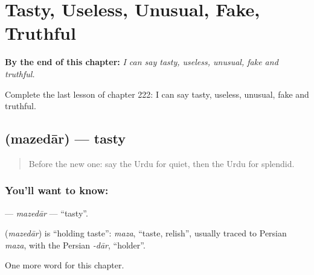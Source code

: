 
\chapter{Tasty, Useless, Unusual, Fake, Truthful}
\label{ch:ur-tasty-useless-unusual-fake-truthful}

\begin{chapteropening}
\textbf{By the end of this chapter:} \emph{I can say tasty, useless, unusual, fake and truthful.}

Complete the last lesson of chapter 222: I can say tasty, useless, unusual, fake and truthful.
\end{chapteropening}

\section[\texorpdfstring{\ur{مزیدار} (mazedār)}{مزیدار (mazedār)}]{ (mazedār) — tasty}

\label{lesson:UR-C222-mazedar}



\begin{quote}
Before the new one: say the Urdu for quiet, then the Urdu for splendid.
\end{quote}

\subsection*{You'll want to know: }
\textbf{} — \emph{mazedār} — \textquotedblleft{}tasty\textquotedblright{}.

\begin{cousinweb}
\textbf{} (\emph{mazedār}) is \textquotedblleft{}holding taste\textquotedblright{}: \emph{maza}, \textquotedblleft{}taste, relish\textquotedblright{}, usually traced to Persian \emph{maza}, with the Persian \emph{-dār}, \textquotedblleft{}holder\textquotedblright{}.
\end{cousinweb}

\begin{grammarlens}[title={What you've built}]
One more word for this chapter.
\end{grammarlens}

